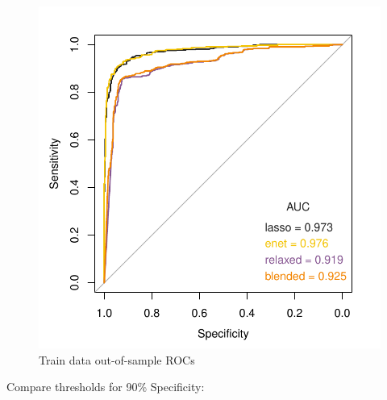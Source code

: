 \documentclass[
]{book}
\begin{document}
\begin{figure}
\centering
\includegraphics{Static/figures/hcc5hmC-glmnetFit-trainROC-1.pdf}
\caption{\label{fig:hcc5hmC-glmnetFit-trainROC}Train data out-of-sample ROCs}
\end{figure}

Compare thresholds for 90\% Specificity:
\end{document}

